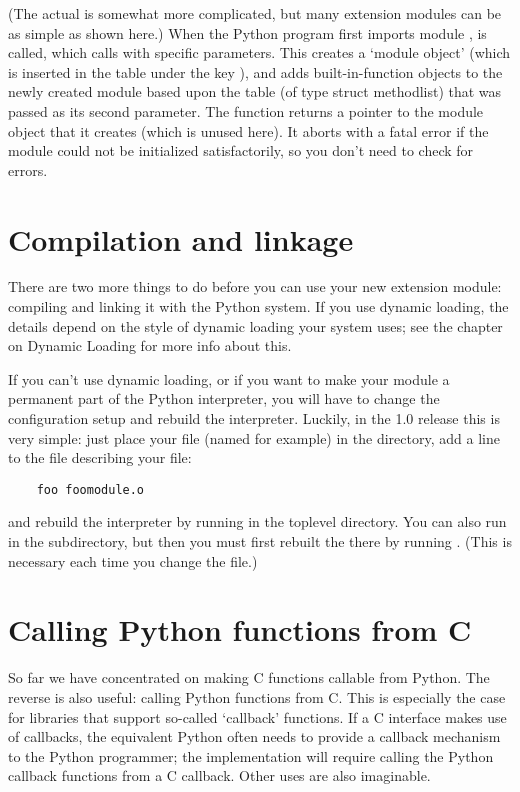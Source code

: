 (The actual  is somewhat more complicated, but many
extension modules can be as simple as shown here.)  When the Python
program first imports module ,  is
called, which calls  with specific parameters.
This creates a `module object' (which is inserted in the table
 under the key ), and adds
built-in-function objects to the newly created module based upon the
table (of type struct methodlist) that was passed as its second
parameter.  The function  returns a pointer to the
module object that it creates (which is unused here).  It aborts with
a fatal error if the module could not be initialized satisfactorily,
so you don't need to check for errors.


\section{Compilation and linkage}

There are two more things to do before you can use your new extension
module: compiling and linking it with the Python system.  If you use
dynamic loading, the details depend on the style of dynamic loading
your system uses; see the chapter on Dynamic Loading for more info
about this.

If you can't use dynamic loading, or if you want to make your module a
permanent part of the Python interpreter, you will have to change the
configuration setup and rebuild the interpreter.  Luckily, in the 1.0
release this is very simple: just place your file (named
 for example) in the  directory, add a
line to the file  describing your file:

\begin{verbatim}
    foo foomodule.o
\end{verbatim}

and rebuild the interpreter by running  in the toplevel
directory.  You can also run  in the 
subdirectory, but then you must first rebuilt the 
there by running .  (This is necessary each time
you change the  file.)


\section{Calling Python functions from C}

So far we have concentrated on making C functions callable from
Python.  The reverse is also useful: calling Python functions from C.
This is especially the case for libraries that support so-called
`callback' functions.  If a C interface makes use of callbacks, the
equivalent Python often needs to provide a callback mechanism to the
Python programmer; the implementation will require calling the Python
callback functions from a C callback.  Other uses are also imaginable.

